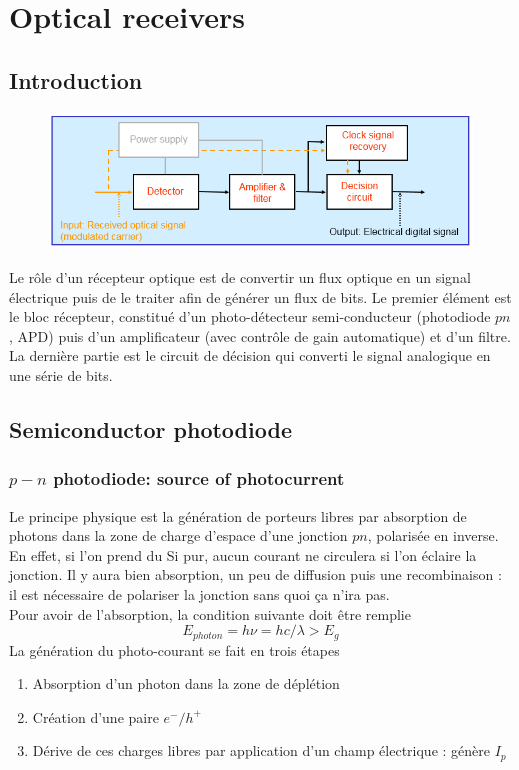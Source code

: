 \chapter{Optical receivers}
\section{Introduction}
\begin{figure}
\vspace{-5mm}
\includegraphics[scale=0.5]{ch5/image1}
\end{figure}
Le rôle d'un récepteur optique est de convertir un flux optique en un signal électrique puis de le
traiter afin de générer un flux de bits. Le premier élément est le bloc récepteur, constitué d'un
photo-détecteur semi-conducteur (photodiode $pn$, APD) puis d'un amplificateur (avec contrôle de 
gain automatique) et d'un filtre.  La dernière partie est le circuit de décision qui converti le 
signal analogique en une série de bits.

\section{Semiconductor photodiode}
\subsection{$p-n$ photodiode: source of photocurrent}
Le principe physique est la génération de porteurs libres par absorption de photons dans la zone
de charge d'espace d'une jonction $pn$, polarisée en inverse. En effet, si l'on prend du Si pur,
aucun courant ne circulera si l'on éclaire la jonction. Il y aura bien absorption, un peu de 
diffusion puis une recombinaison : il est nécessaire de polariser la jonction sans quoi ça n'ira pas.\\

Pour avoir de l'absorption, la condition suivante doit être remplie
\begin{equation}
{E_{photon}} = h\nu  = hc/\lambda  > {E_g}
\end{equation}
La génération du photo-courant se fait en trois étapes
\begin{enumerate}
\item Absorption d'un photon dans la zone de déplétion
\item Création d'une paire $e^-/h^+$
\item Dérive de ces charges libres par application d'un champ électrique : génère $I_p$
\end{enumerate}


